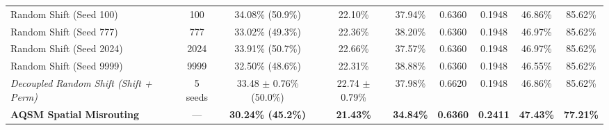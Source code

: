 \begin{table}[!htbp]
{\begin{tabular}{lcccccccc}
Random Shift (Seed 100) & 100 & 34.08\% (50.9\%) & 22.10\% & 37.94\% & 0.6360 & 0.1948 & 46.86\% & 85.62\% \\
Random Shift (Seed 777) & 777 & 33.02\% (49.3\%) & 22.36\% & 38.20\% & 0.6360 & 0.1948 & 46.97\% & 85.62\% \\
Random Shift (Seed 2024) & 2024 & 33.91\% (50.7\%) & 22.66\% & 37.57\% & 0.6360 & 0.1948 & 46.97\% & 85.62\% \\
Random Shift (Seed 9999) & 9999 & 32.50\% (48.6\%) & 22.31\% & 38.88\% & 0.6360 & 0.1948 & 46.55\% & 85.62\% \\
\midrule
\textit{Decoupled Random Shift (Shift + Perm)} & 5 seeds & 33.48 $\pm$ 0.76\% (50.0\%) & 22.74 $\pm$ 0.79\% & 37.98\% & 0.6620 & 0.1948 & 46.86\% & 85.62\% \\
\midrule
\textbf{AQSM Spatial Misrouting} & --- & \textbf{30.24\% (45.2\%)} & \textbf{21.43\%} & \textbf{34.84\%} & \textbf{0.6360} & \textbf{0.2411} & \textbf{47.43\%} & \textbf{77.21\%} \\
\bottomrule
\end{tabular}%
}
\end{table}


\begin{table}[!htbp]
\centering
\caption{Matched-budget mechanistic comparison on COCO val2017 at native $640 \times 640$ resolution across $\epsilon \in \{4/255, 8/255, 16/255\}$ on $N = 300$ images. Demonstrates that Standard Task PGD degrades detection metrics across budgets, while AQSM accentuates encoder query eviction and spatial misrouting as an essential secondary transmission channel alongside encoder memory corruption.}
\label{tab:tab9_matched_budget}
\end{table}


